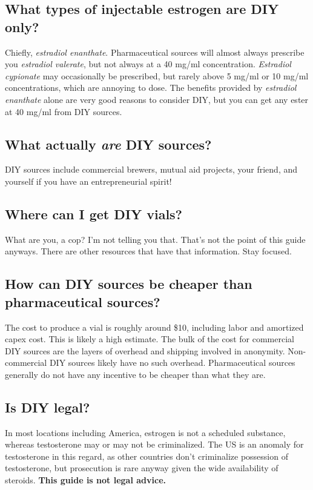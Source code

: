 \documentclass{article}
\begin{document}
\subsection{What types of injectable estrogen are DIY only?}

Chiefly, \textit{estradiol enanthate}. Pharmaceutical sources will almost always prescribe you \textit{estradiol valerate}, but not always at a 40 mg/ml concentration. \textit{Estradiol cypionate} may occasionally be prescribed, but rarely above 5 mg/ml or 10 mg/ml concentrations, which are annoying to dose. The benefits provided by \textit{estradiol enanthate} alone are very good reasons to consider DIY, but you can get any ester at 40 mg/ml from DIY sources.

\subsection{What actually \textit{are} DIY sources?}

DIY sources include commercial brewers, mutual aid projects, your friend, and yourself if you have an entrepreneurial spirit!

\subsection{Where can I get DIY vials?}

What are you, a cop? I’m not telling you that. That’s not the point of this guide anyways. There are other resources that have that information. Stay focused.

\subsection{How can DIY sources be cheaper than pharmaceutical sources?}

The cost to produce a vial is roughly around \$10, including labor and amortized capex cost. This is likely a high estimate. The bulk of the cost for commercial DIY sources are the layers of overhead and shipping involved in anonymity. Non-commercial DIY sources likely have no such overhead. Pharmaceutical sources generally do not have any incentive to be cheaper than what they are. 

\subsection{Is DIY legal?}\label{6-11}

In most locations including America, estrogen is not a scheduled substance, whereas testosterone may or may not be criminalized. The US is an anomaly for testosterone in this regard, as other countries don’t criminalize possession of testosterone, but prosecution is rare anyway given the wide availability of steroids. \textbf{This guide is not legal advice.}
\end{document}
